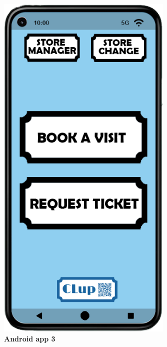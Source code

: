\begin{figure}[!b]
\centering
\begin{minipage}{0.4\textwidth}
\centering
\includegraphics[width=0.75\textwidth]{Images/App/Android_MainScreenv2}
\caption{\label{fig:android3}\textbf{Android app 3}}
\end{minipage}
\begin{minipage}{0.4\textwidth}
\centering

\end{minipage}
\end{figure}
